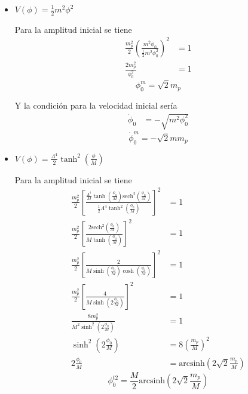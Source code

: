 \begin{itemize}
    \item $\displaystyle V(\phi) = \frac{1}{2} m^2 \phi^2$
    
    Para la amplitud inicial se tiene
    \begin{equation*}
        \begin{split}
            \frac{m_p^2}{2} \left( \frac{m^2 \phi_0}{\frac{1}{2} m^2 \phi_0^2} \right)^2 &= 1\\
            \frac{2 m_p^2}{\phi_0^2} &= 1
        \end{split}
    \end{equation*}
    \begin{equation}
        \phi_0^{m} = \sqrt{2} m_p
    \end{equation}

    Y la condición para la velocidad inicial sería
    \begin{equation*}
        \begin{split}
            \dot{\phi}_0 &= - \sqrt{m^2 \phi_0^2}
        \end{split}
    \end{equation*}
    \begin{equation}
        \dot{\phi}_0^{m} = - \sqrt{2} m m_p
    \end{equation}

    \item $\displaystyle V(\phi) = \frac{\Lambda^4}{2} \tanh^2 \left( \frac{\phi}{M} \right)$
    
    Para la amplitud inicial se tiene
    \begin{equation*}
        \begin{split}
            \frac{m_p^2}{2} \left[ \frac{\frac{\Lambda^4}{M} \tanh \left( \frac{\phi_0}{M} \right) \text{sech}^2 \left( \frac{\phi_0}{M} \right)}{\frac{1}{2} \Lambda^4 \tanh^2 \left( \frac{\phi_0}{M} \right)} \right]^2 &= 1\\
            \frac{m_p^2}{2} \left[ \frac{2 \text{sech}^2 \left( \frac{\phi_0}{M} \right)}{M \tanh \left( \frac{\phi_0}{M} \right)} \right]^2 &= 1\\
            \frac{m_p^2}{2} \left[ \frac{2}{M \sinh \left( \frac{\phi_0}{M} \right) \cosh \left( \frac{\phi_0}{M} \right)} \right]^2 &= 1\\
            \frac{m_p^2}{2} \left[ \frac{4}{M \sinh \left( 2 \frac{\phi_0}{M} \right)} \right]^2 &= 1\\
            \frac{8 m_p^2}{M^2 \sinh^2 \left( 2 \frac{\phi_0}{M} \right)} &= 1\\
            \sinh^2 \left( 2 \frac{\phi_0}{M} \right) &= 8 \left( \frac{m_p}{M} \right)^2\\
            2 \frac{\phi_0}{M} &= \text{arcsinh} \left( 2 \sqrt{2} \frac{m_p}{M} \right)
        \end{split}
    \end{equation*}
    \begin{equation}
        \phi_0^{t2} = \frac{M}{2} \text{arcsinh} \left( 2 \sqrt{2} \frac{m_p}{M} \right)
    \end{equation}


\end{itemize}
